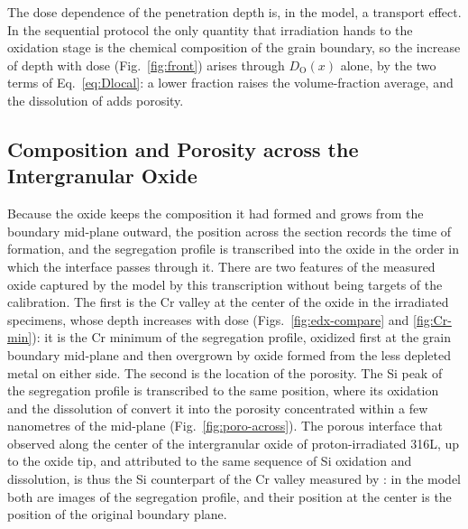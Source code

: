 \documentclass[3p,times,nonatbib]{elsarticle} %
\newcommand{\Ox}{\mathrm{O}}           %
\begin{document}
The dose dependence of the penetration depth is, in the model, a transport
effect. In the sequential protocol the only quantity that irradiation hands
to the oxidation stage is the chemical composition of the grain boundary, so the increase of depth with dose
(Fig.~\ref{fig:front}) arises through \(D_{\Ox}(x)\) alone, by the two terms
of Eq.~\eqref{eq:Dlocal}: a lower  fraction raises the volume-fraction average, and the dissolution of  adds porosity.

\subsection{Composition and Porosity across the Intergranular Oxide}
\label{sec:discussionTranscription}

Because the oxide keeps the composition it had formed and grows from
the boundary mid-plane outward, the position across the section records the
time of formation, and the segregation profile is transcribed into the oxide
in the order in which the interface passes through it. There are two features of the
measured oxide captured by the model by this transcription without being targets of the
calibration. The first is the Cr valley at the
center of the oxide in the irradiated specimens, whose depth increases with
dose (Figs.~\ref{fig:edx-compare} and \ref{fig:Cr-min}): it is the Cr minimum
of the segregation profile, oxidized first at the grain boundary mid-plane and then
overgrown by oxide formed from the less depleted metal on either side. The
second is the location of the porosity. The Si peak of the segregation
profile is transcribed to the same position, where its oxidation and the
dissolution of  convert it into the porosity concentrated within a
few nanometres of the mid-plane (Fig.~\ref{fig:poro-across}). The porous
interface that \textcite{kuang2022highresolution} observed along the center
of the intergranular oxide of proton-irradiated 316L, up to the oxide tip,
and attributed to the same sequence of Si oxidation and dissolution, is thus
the Si counterpart of the Cr valley measured by \textcite{deng2017effect}: in
the model both are images of the segregation profile, and their position at
the center is the position of the original boundary plane.
\end{document}
